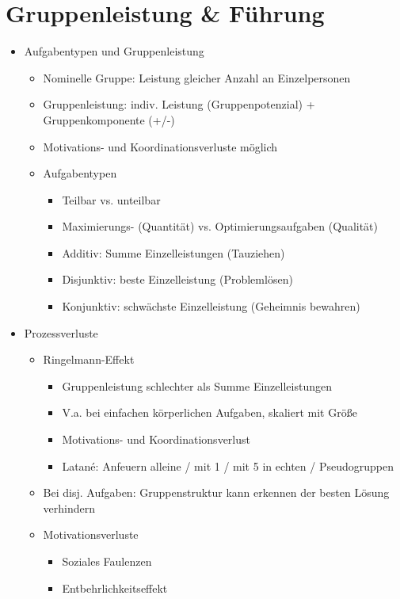 \documentclass[11pt, paper=a4, twocolumn]{scrartcl}
\begin{document}
	\section{Gruppenleistung \& Führung}
		\begin{itemize}
			\item Aufgabentypen und Gruppenleistung
				\begin{itemize}
					\item Nominelle Gruppe: Leistung gleicher Anzahl an Einzelpersonen
					\item Gruppenleistung: indiv. Leistung (Gruppenpotenzial) + Gruppenkomponente (+/-)
					\item Motivations- und Koordinationsverluste möglich
					\item Aufgabentypen
						\begin{itemize}
							\item Teilbar vs. unteilbar
							\item Maximierungs- (Quantität) vs. Optimierungsaufgaben (Qualität)
							\item Additiv: Summe Einzelleistungen (Tauziehen)
							\item Disjunktiv: beste Einzelleistung (Problemlösen)
							\item Konjunktiv: schwächste Einzelleistung (Geheimnis bewahren)
						\end{itemize}
				\end{itemize}
			\item Prozessverluste
				\begin{itemize}
					\item Ringelmann-Effekt
						\begin{itemize}
							\item Gruppenleistung schlechter als Summe Einzelleistungen
							\item V.a. bei einfachen körperlichen Aufgaben, skaliert mit Größe
							\item Motivations- und Koordinationsverlust
							\item Latané: Anfeuern alleine / mit 1 / mit 5 in echten / Pseudogruppen
						\end{itemize}
					\item Bei disj. Aufgaben: Gruppenstruktur kann erkennen der besten Lösung verhindern
					\item Motivationsverluste
						\begin{itemize}
							\item Soziales Faulenzen
							\item Entbehrlichkeitseffekt

\end{itemize}
\end{itemize}
\end{itemize}
\end{document}
